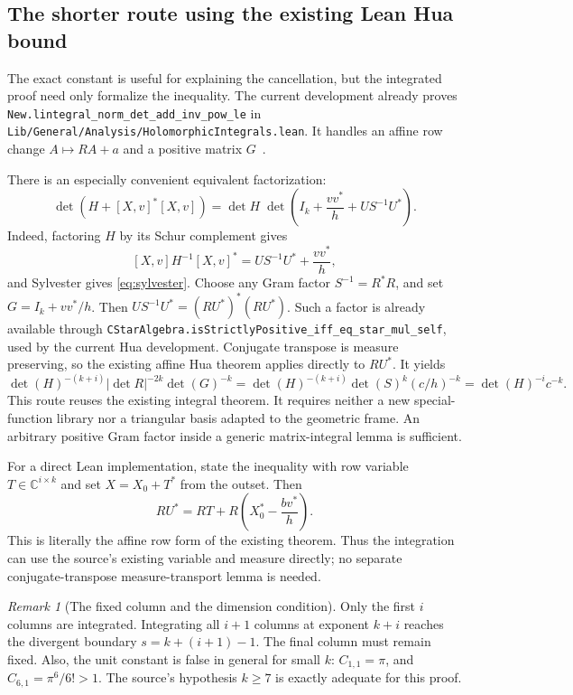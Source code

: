 \documentclass[11pt,letterpaper]{article}
\theoremstyle{remark}
\newtheorem{remark}[theorem]{Remark}
\newcommand{\C}{\mathbb C}
\newcommand{\Id}{I}
\newcommand{\abs}[1]{\left|#1\right|}
\newcommand{\code}[1]{{\small\urlstyle{tt}\nolinkurl{#1}}}
\begin{document}
\subsection{The shorter route using the existing Lean Hua bound}

The exact constant is useful for explaining the cancellation, but the integrated
proof need only formalize the inequality. The current development already proves
\code{New.lintegral_norm_det_add_inv_pow_le} in
\code{Lib/General/Analysis/HolomorphicIntegrals.lean}. It handles an affine row
change $A\mapsto RA+a$ and a positive matrix $G$~\cite{hua}.

There is an especially convenient equivalent factorization:
\begin{equation}\label{eq:sylvester}
 \det(H+[X,v]^*[X,v])
 =\det H\;\det\left(\Id_k+\frac{vv^*}{h}+US^{-1}U^*\right).
\end{equation}
Indeed, factoring $H$ by its Schur complement gives
\[
 [X,v]H^{-1}[X,v]^*=US^{-1}U^*+\frac{vv^*}{h},
\]
and Sylvester gives \eqref{eq:sylvester}.
Choose any Gram factor $S^{-1}=R^*R$, and set
$G=\Id_k+vv^*/h$. Then $US^{-1}U^*=(RU^*)^*(RU^*)$.
Such a factor is already available through
\code{CStarAlgebra.isStrictlyPositive_iff_eq_star_mul_self}, used by the
current Hua development. Conjugate transpose is measure preserving, so the
existing affine Hua theorem applies directly to $RU^*$. It yields
\[
 \det(H)^{-(k+i)}\abs{\det R}^{-2k}\det(G)^{-k}
 =\det(H)^{-(k+i)}\det(S)^k(c/h)^{-k}
 =\det(H)^{-i}c^{-k}.
\]
This route reuses the existing integral theorem. It requires neither a new
special-function library nor a triangular basis adapted to the geometric frame.
An arbitrary positive Gram factor inside a generic matrix-integral lemma is
sufficient.

For a direct Lean implementation, state the inequality with row variable
$T\in\C^{i\times k}$ and set $X=X_0+T^*$ from the outset. Then
\[
 RU^*=RT+R\left(X_0^*-\frac{bv^*}{h}\right).
\]
This is literally the affine row form of the existing theorem. Thus the
integration can use the source's existing variable and measure directly;
no separate conjugate-transpose measure-transport lemma is needed.

\begin{remark}[The fixed column and the dimension condition]
Only the first $i$ columns are integrated. Integrating all $i+1$ columns at
exponent $k+i$ reaches the divergent boundary $s=k+(i+1)-1$.
The final column must remain fixed. Also, the unit constant is false in general
for small $k$: $C_{1,1}=\pi$, and $C_{6,1}=\pi^6/6!>1$.
The source's hypothesis $k\geq7$ is exactly adequate for this proof.
\end{remark}
\end{document}

